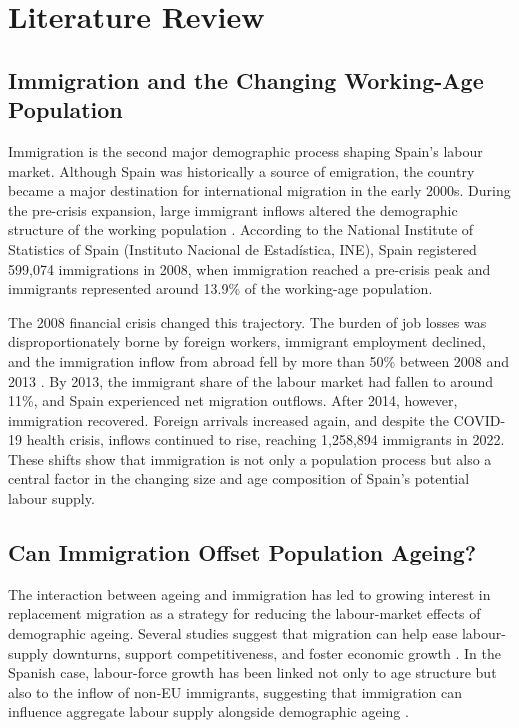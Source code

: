 \section{Literature Review}









\subsection{Immigration and the Changing Working-Age Population}

Immigration is the second major demographic process shaping Spain's labour market. Although Spain was historically a source of emigration, the country became a major destination for international migration in the early 2000s. During the pre-crisis expansion, large immigrant inflows altered the demographic structure of the working population \parencite{amuedo2008complements,arango2013exceptional,gonzalez2011very}. According to the National Institute of Statistics of Spain (Instituto Nacional de Estadística, INE), Spain registered 599,074 immigrations in 2008, when immigration reached a pre-crisis peak and immigrants represented around 13.9\% of the working-age population.

\vspace{0.7em}\par
The 2008 financial crisis changed this trajectory. The burden of job losses was disproportionately borne by foreign workers, immigrant employment declined, and the immigration inflow from abroad fell by more than 50\% between 2008 and 2013 \parencite{rodriguez2016labor}. By 2013, the immigrant share of the labour market had fallen to around 11\%, and Spain experienced net migration outflows. After 2014, however, immigration recovered. Foreign arrivals increased again, and despite the COVID-19 health crisis, inflows continued to rise, reaching 1,258,894 immigrants in 2022. These shifts show that immigration is not only a population process but also a central factor in the changing size and age composition of Spain's potential labour supply.

\subsection{Can Immigration Offset Population Ageing?}

The interaction between ageing and immigration has led to growing interest in replacement migration as a strategy for reducing the labour-market effects of demographic ageing. Several studies suggest that migration can help ease labour-supply downturns, support competitiveness, and foster economic growth \parencite{stepanek2022sectoral,okamoto2021immigration,united2000replacement}. In the Spanish case, labour-force growth has been linked not only to age structure but also to the inflow of non-EU immigrants, suggesting that immigration can influence aggregate labour supply alongside demographic ageing \parencite{casares2018labor}.

